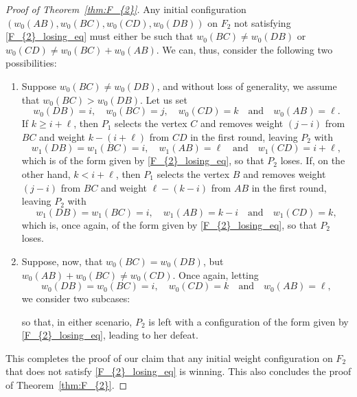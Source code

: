 \documentclass[11pt,reqno]{amsart}
\theoremstyle{definition}
\theoremstyle{definition}
\begin{document}
\begin{proof}[Proof of Theorem~\ref{thm:F_{2}}]
Any initial configuration $\left(w_{0}(AB),w_{0}(BC),w_{0}(CD),w_{0}(DB)\right)$ on $F_{2}$ not satisfying \eqref{F_{2}_losing_eq} must either be such that $w_{0}(BC) \neq w_{0}(DB)$ or $w_{0}(CD) \neq w_{0}(BC)+w_{0}(AB)$. We can, thus, consider the following two possibilities:
\begin{enumerate}
\item Suppose $w_{0}(BC) \neq w_{0}(DB)$, and without loss of generality, we assume that $w_{0}(BC) > w_{0}(DB)$. Let us set
\begin{equation}
w_{0}(DB)=i,\quad w_{0}(BC)=j,\quad w_{0}(CD)=k \quad \text{and} \quad w_{0}(AB)=\ell.\nonumber
\end{equation}
If $k \geqslant i+\ell$, then $P_{1}$ selects the vertex $C$ and removes weight $(j-i)$ from $BC$ and weight $k-(i+\ell)$ from $CD$ in the first round, leaving $P_{2}$ with 
\begin{equation}
w_{1}(DB)=w_{1}(BC)=i, \quad w_{1}(AB)=\ell \quad \text{and} \quad w_{1}(CD)=i+\ell,\nonumber
\end{equation}
which is of the form given by \eqref{F_{2}_losing_eq}, so that $P_{2}$ loses. If, on the other hand, $k < i+\ell$, then $P_{1}$ selects the vertex $B$ and removes weight $(j-i)$ from $BC$ and weight $\ell-(k-i)$ from $AB$ in the first round, leaving $P_{2}$ with
\begin{equation}
w_{1}(DB)=w_{1}(BC)=i, \quad w_{1}(AB)=k-i \quad \text{and} \quad w_{1}(CD)=k,\nonumber
\end{equation}
which is, once again, of the form given by \eqref{F_{2}_losing_eq}, so that $P_{2}$ loses. 

\item Suppose, now, that $w_{0}(BC)=w_{0}(DB)$, but $w_{0}(AB)+w_{0}(BC) \neq w_{0}(CD)$. Once again, letting
\begin{equation}
w_{0}(DB)=w_{0}(BC)=i, \quad w_{0}(CD)=k \quad \text{and} \quad w_{0}(AB)=\ell,\nonumber
\end{equation}
we consider two subcases: 
so that, in either scenario, $P_{2}$ is left with a configuration of the form given by \eqref{F_{2}_losing_eq}, leading to her defeat.
\end{enumerate}

This completes the proof of our claim that any initial weight configuration on $F_{2}$ that does not satisfy \eqref{F_{2}_losing_eq} is winning. This also concludes the proof of Theorem~\ref{thm:F_{2}}.
\end{proof}
\end{document}
